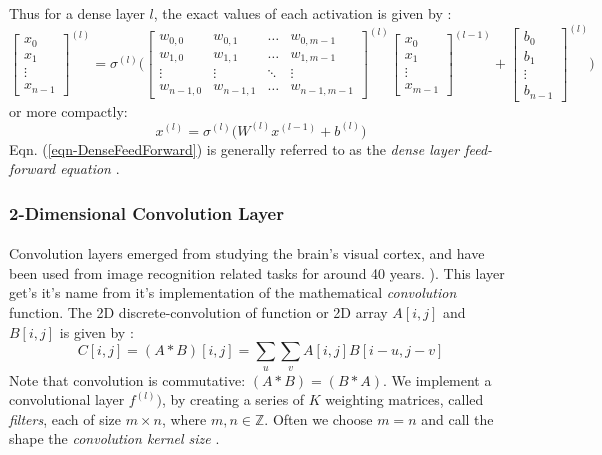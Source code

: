 \documentclass[12pt,letterpaper]{article}
\begin{document}
Thus for a dense layer $l$, the exact values of each activation is given by \cite{Geron,Loy}:
\begin{equation}
\begin{bmatrix}
x_0 \\ x_1 \\ \vdots \\ x_{n-1}
\end{bmatrix}^{(l)} =
\sigma^{(l)} \Bigg(
\begin{bmatrix}
w_{0,0} & w_{0,1} & \hdots & w_{0,m-1} \\
w_{1,0} & w_{1,1} & \hdots & w_{1,m-1} \\
\vdots & \vdots & \ddots & \vdots  \\
w_{n-1,0} & w_{n-1,1} & \hdots & w_{n-1,m-1} 
\end{bmatrix}^{(l)} 
\begin{bmatrix}
x_0 \\ x_1 \\ \vdots \\ x_{m-1}
\end{bmatrix}^{(l-1)} +
\begin{bmatrix}
b_0 \\ b_1 \\ \vdots \\ b_{n-1}
\end{bmatrix}^{(l)} \Bigg)
\end{equation}
or more compactly:
\begin{equation}
\label{eqn-DenseFeedForward}
x^{(l)} = \sigma^{(l)} \Big( W^{(l)} x^{(l-1)} + b^{(l)} \Big)
\end{equation}
Eqn. (\ref{eqn-DenseFeedForward}) is generally referred to as the \textit{dense layer feed-forward equation} \cite{Goodfellow}. 


\subsubsection{2-Dimensional Convolution Layer}
\label{subsubsec-Conv2DLayer}

\paragraph*{}Convolution layers emerged from studying the brain's visual cortex, and have been used from image recognition related tasks for around 40 years. \cite{Geron,Loy}). This layer get's it's name from it's implementation of the mathematical \textit{convolution} function. The 2D discrete-convolution of function or 2D array $A[i,j]$ and $B[i,j]$ is given by \cite{Goodfellow}:
\begin{equation}
\label{eqn-convolution}
C[i,j] = (A * B)[i,j] = \sum_{u}\sum_{v} A[i,j]B[i - u,j - v]
\end{equation}
Note that convolution is commutative: $(A * B) = (B * A)$. We implement a convolutional layer $f^{(l)})$, by creating a series of $K$ weighting matrices, called \textit{filters}, each of size $m \times n$, where $m,n \in \mathbb{Z}$. Often we choose $m = n$ and call the shape the \textit{convolution kernel size} \cite{Loy, Goodfellow}.
\end{document}
